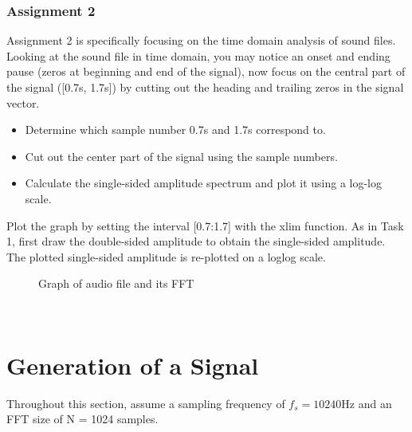 \documentclass[
	a4paper,
	11pt,
]{article}
\begin{document}
\subsubsection{Assignment 2}
Assignment 2 is specifically focusing on the time domain analysis of sound files. Looking at the sound file in time domain, you may notice an onset and ending pause (zeros at beginning and end of the signal), now focus on the central part of the signal ([0.7s, 1.7s]) by cutting out the heading and trailing zeros in the signal vector.\\


\begin{itemize}
\item Determine which sample number 0.7s and 1.7s correspond to.
\item Cut out the center part of the signal using the sample numbers.
\item Calculate the single-sided amplitude spectrum and plot it using a log-log scale.

\end{itemize}

Plot the graph by setting the interval [0.7:1.7] with the xlim function. As in Task 1, first draw the double-sided amplitude to obtain the single-sided amplitude. The plotted single-sided amplitude is re-plotted on a loglog scale.

\begin{figure}%
    \centering
    \qquad
    \caption{Graph of audio file and its FFT}%
    \label{fig:example}%
\end{figure}
\\


\section{Generation of a Signal}
Throughout this section, assume a sampling frequency of \(f_s = 10240\)Hz and an FFT size of N = 1024 samples.
\end{document}
